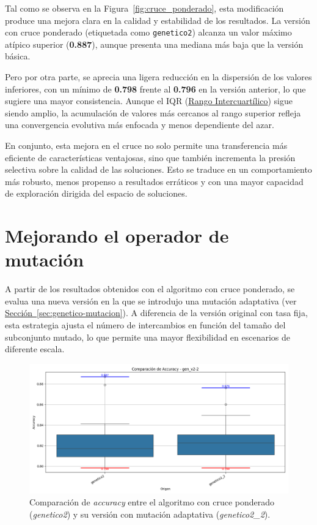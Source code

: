 Tal como se observa en la Figura~\ref{fig:cruce_ponderado}, esta modificación produce una mejora clara en la calidad y estabilidad de los resultados.
La versión con cruce ponderado (etiquetada como \texttt{genetico2}) alcanza un valor máximo atípico superior (\textbf{0.887}),
aunque presenta una mediana más baja que la versión básica.

Pero por otra parte, se aprecia una ligera reducción en la dispersión de los valores inferiores,
con un mínimo de \textbf{0.798} frente al \textbf{0.796} en la versión anterior, lo que sugiere una mayor consistencia.
Aunque el IQR (\hyperref[subsec:visualizacion-de-resultados]{Rango Intercuartílico}) sigue siendo amplio,
la acumulación de valores más cercanos al rango superior refleja una convergencia evolutiva más enfocada y menos dependiente del azar.

En conjunto, esta mejora en el cruce no solo permite una transferencia más eficiente de características ventajosas,
sino que también incrementa la presión selectiva sobre la calidad de las soluciones.
Esto se traduce en un comportamiento más robusto, menos propenso a resultados erráticos y con una mayor capacidad de exploración dirigida del espacio de soluciones.


\section{Mejorando el operador de mutación}\label{sec:mejorando-mutacion}
A partir de los resultados obtenidos con el algoritmo con cruce ponderado, se evalua una nueva versión en la que se introdujo una mutación adaptativa
(ver \hyperref[sec:genetico-mutacion]{Sección~\ref*{sec:genetico-mutacion}}).
A diferencia de la versión original con tasa fija, esta estrategia ajusta el número de intercambios en función del tamaño del subconjunto mutado,
lo que permite una mayor flexibilidad en escenarios de diferente escala.

\begin{figure}[htp]
    \centering
    \includegraphics[width=1\textwidth]{imagenes/evaluaciones/mutacion-adaptativa}
    \caption{Comparación de \textit{accuracy} entre el algoritmo con cruce ponderado (\textit{genetico2}) y su versión con mutación adaptativa (\textit{genetico2\_2}).}
    \label{fig:mutacion-adaptativa}
\end{figure}

